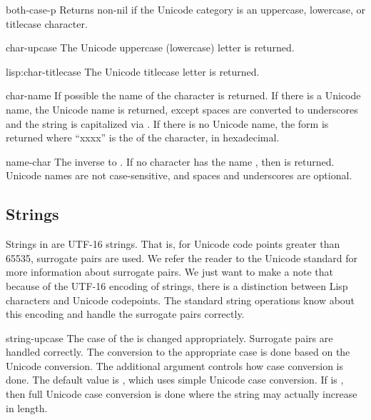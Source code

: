 \begin{defun}{}{both-case-p}{\args {}}
  Returns non-nil{} if the Unicode category is an uppercase,
  lowercase, or titlecase character.
\end{defun}

\begin{defun}{}{char-upcase}{\args {}}
  The Unicode uppercase (lowercase) letter is returned.
\end{defun}

\begin{defun}{lisp:}{char-titlecase}{\args {}}
  The Unicode titlecase letter is returned.
\end{defun}

\begin{defun}{}{char-name}{\args {}}
   If possible the name of the character  is returned.  If
   there is a Unicode name, the Unicode name is returned, except
   spaces are converted to underscores and the string is capitalized
   via .  If there is no Unicode name, the
   form  is returned where ``xxxx'' is the
    of the character, in hexadecimal.
\end{defun}

\begin{defun}{}{name-char}{\args {}}
  The inverse to .  If no character has the name
  , then \nil{} is returned.  Unicode names are not
  case-sensitive, and spaces and underscores are optional.
\end{defun}
\subsection{Strings}

Strings in \cmucl{} are UTF-16 strings.  That is, for Unicode code
points greater than 65535, surrogate pairs are used.  We refer the
reader to the Unicode standard for more information about surrogate
pairs.  We just want to make a note that because of the UTF-16
encoding of strings, there is a distinction between Lisp characters
and Unicode codepoints.  The standard string operations know about
this encoding and handle the surrogate pairs correctly.


\begin{defun}{}{string-upcase}{\args {} }
  The case of the  is changed appropriately.  Surrogate
  pairs are handled correctly.  The conversion to the appropriate case
  is done based on the Unicode conversion.  The additional argument
   controls how case conversion is done.  The default
  value is , which uses simple Unicode case conversion.
  If  is , then full Unicode case conversion is
  done where the string may actually increase in length.
\end{defun}

